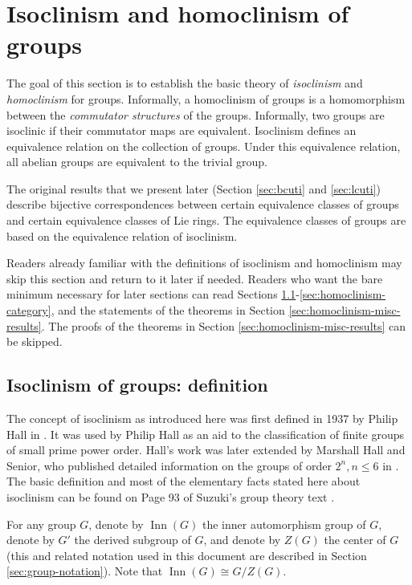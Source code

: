 \documentclass{ucetd}
\begin{document}
\section{Isoclinism and homoclinism of groups}\label{sec:isoclinism-and-homoclinism}

The goal of this section is to establish the basic theory of {\em
  isoclinism} and {\em homoclinism} for groups. Informally, a
homoclinism of groups is a homomorphism between the {\em commutator
  structures} of the groups. Informally, two groups are isoclinic if
their commutator maps are equivalent. Isoclinism defines an
equivalence relation on the collection of groups. Under this
equivalence relation, all abelian groups are equivalent to the trivial
group.

The original results that we present later (Section \ref{sec:bcuti}
and \ref{sec:lcuti}) describe bijective correspondences between
certain equivalence classes of groups and certain equivalence classes
of Lie rings. The equivalence classes of groups are based on the
equivalence relation of isoclinism.

Readers already familiar with the definitions of isoclinism and
homoclinism may skip this section and return to it later if needed.
Readers who want the bare minimum necessary for later sections can
read Sections
\ref{sec:isoclinism-definition}-\ref{sec:homoclinism-category}, and
the statements of the theorems in Section
\ref{sec:homoclinism-misc-results}. The proofs of the theorems in
Section \ref{sec:homoclinism-misc-results} can be skipped.


\subsection{Isoclinism of groups: definition}\label{sec:isoclinism-definition}

The concept of isoclinism as introduced here was first defined in 1937
by Philip Hall in \cite{Hall37}. It was used by Philip Hall as an aid
to the classification of finite groups of small prime power
order. Hall's work was later extended by Marshall Hall and Senior, who
published detailed information on the groups of order $2^n, n \le 6$
in \cite{HallSenior}. The basic definition and most of the elementary
facts stated here about isoclinism can be found on Page 93 of Suzuki's
group theory text \cite{SuzukiII}.

For any group $G$, denote by $\operatorname{Inn}(G)$ the inner
automorphism group of $G$, denote by $G'$ the derived subgroup of $G$,
and denote by $Z(G)$ the center of $G$ (this and related notation used
in this document are described in Section \ref{sec:group-notation}). Note that $\operatorname{Inn}(G) \cong G/Z(G)$.
\end{document}
